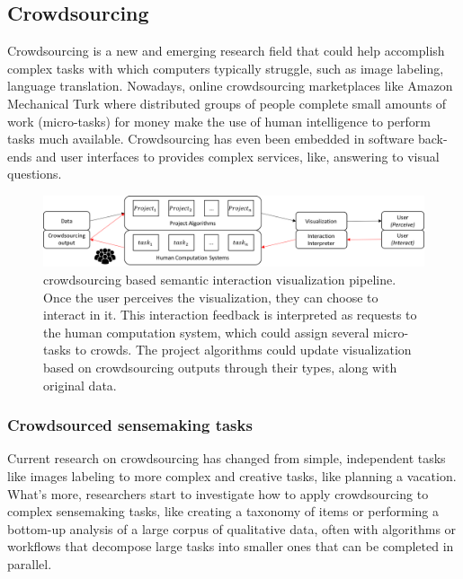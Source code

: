 \documentclass[journal]{vgtc}                %
\begin{document}
\subsection{Crowdsourcing}

Crowdsourcing\cite{Law:2011cq} is a new and emerging research field that could help accomplish complex tasks with which computers typically struggle, such as image labeling, language translation.
Nowadays, online crowdsourcing marketplaces like Amazon Mechanical Turk\cite{MTurk} where distributed groups of people complete small amounts of work (micro-tasks) for money make the use of human intelligence to perform tasks much available. Crowdsourcing has even been embedded in software back-ends and user interfaces to provides complex services, like, answering to visual questions\cite{Bigham:2010cj}.


\begin{figure}[!htbp]
 \centering %
  \includegraphics[width=\textwidth]{Pipeline}
 \caption{crowdsourcing based semantic interaction visualization pipeline.
 Once the user perceives the visualization, they can choose to interact in it.
 This interaction feedback is interpreted as requests to the human computation system, which could assign several micro-tasks to crowds.
 The project algorithms could update visualization based on crowdsourcing outputs through their types, along with original data.
	 }
 \label{fig:Pipeline}
\end{figure}

\subsubsection{Crowdsourced sensemaking tasks}
Current research on crowdsourcing has changed from simple, independent tasks like images labeling\cite{welinder2010online} to more complex and creative tasks, like planning a vacation\cite{Zhang2012}. What's more, researchers start to investigate how to apply crowdsourcing to complex sensemaking tasks, like creating a taxonomy of items or performing a bottom-up analysis of a large corpus of qualitative data, often with algorithms or workflows that decompose large tasks into smaller ones that can be completed in parallel.
\end{document}
